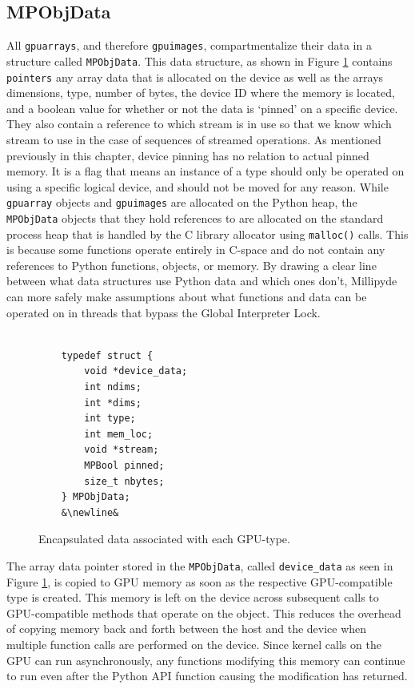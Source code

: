 \subsection{MPObjData}

All \verb|gpuarrays|, and therefore \verb|gpuimages|, compartmentalize their data in a structure called \verb|MPObjData|. This data structure, as shown in Figure \ref{mpobjdata} contains \verb|pointers| any array data that is allocated on the device as well as the arrays dimensions, type, number of bytes, the device ID where the memory is located, and a boolean value for whether or not the data is `pinned' on a specific device. They also contain a reference to which stream is in use so that we know which stream to use in the case of sequences of streamed operations. As mentioned previously in this chapter, device pinning has no relation to actual pinned memory. It is a flag that means an instance of a type should only be operated on using a specific logical device, and should not be moved for any reason. While \verb|gpuarray| objects and \verb|gpuimages| are allocated on the Python heap, the \verb|MPObjData| objects that they hold references to are allocated on the standard process heap that is handled by the C library allocator using \verb|malloc()| calls. This is because some functions operate entirely in C-space and do not contain any references to Python functions, objects, or memory. By drawing a clear line between what data structures use Python data and which ones don't, Millipyde can more safely make assumptions about what functions and data can be operated on in threads that bypass the Global Interpreter Lock. 

\begin{figure}[hbtp]
    \begin{lstlisting}
    
    typedef struct {
        void *device_data;
        int ndims;
        int *dims;
        int type;
        int mem_loc;
        void *stream;
        MPBool pinned;
        size_t nbytes;
    } MPObjData;
    &\newline&
    \end{lstlisting}
    \caption{Encapsulated data associated with each GPU-type.}
    \label{mpobjdata}
\end{figure}

\quad The array data pointer stored in the \verb|MPObjData|, called \verb|device_data| as seen in Figure \ref{mpobjdata}, is copied to GPU memory as soon as the respective GPU-compatible type is created. This memory is left on the device across subsequent calls to GPU-compatible methods that operate on the object. This reduces the overhead of copying memory back and forth between the host and the device when multiple function calls are performed on the device. Since kernel calls on the GPU can run asynchronously, any functions modifying this memory can continue to run even after the Python API function causing the modification has returned. 

